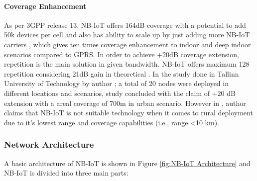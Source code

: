 \documentclass[12pt]{article}
\begin{document}
\paragraph{Coverage Enhancement}
As per 3GPP release 13, NB-IoT offers 164dB coverage with a potential to add 50k devices per cell and also has ability to scale up by just adding more NB-IoT carriers \cite{raza2017low,farrell2018low}, which gives ten times coverage enhancement to indoor and deep indoor scenarios compared to GPRS. In order to achieve +20dB coverage extension, repetition is the main solution in given bandwidth. NB-IoT offers maximum 128 repetition considering 21dB gain in theoretical \cite{bao2018coverage,mwakwata2019narrowband}. In the study done in Tallinn University of Technology by author \cite{malik2019nb}; a total of 20 nodes were deployed in different locations and scenarios, study concluded with the claim of +20 dB extension with a areal coverage of 700m in urban scenario. However in \cite{mekki2019comparative}, author claims that NB-IoT is not suitable technology when it comes to rural deployment due to it's lowest range and coverage capabilities (i.e., range <10 km).

\subsubsection{Network Architecture}

A basic architecture of NB-IoT is shown in Figure \ref{fig:NB-IoT Architecture} and NB-IoT is divided into three main parts:
\end{document}
